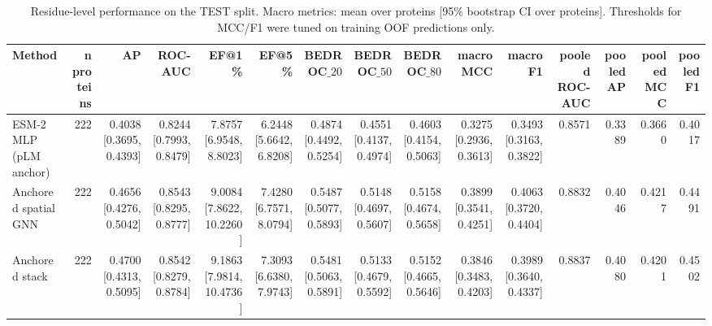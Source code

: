 \begin{table}[t]
\centering
\small
\caption{Residue-level performance on the TEST split. Macro metrics: mean over proteins [95\% bootstrap CI over proteins]. Thresholds for MCC/F1 were tuned on training OOF predictions only.}
\label{tab:table1_performance_test}
\begin{tabular}{lrrrrrrrrrrrrrr}
\toprule
Method & n proteins & AP & ROC-AUC & EF@1\% & EF@5\% & BEDROC$\_{20}$ & BEDROC$\_{50}$ & BEDROC$\_{80}$ & macro MCC & macro F1 & pooled ROC-AUC & pooled AP & pooled MCC & pooled F1 \\
\midrule
ESM-2 MLP (pLM anchor) & 222 & 0.4038 [0.3695, 0.4393] & 0.8244 [0.7993, 0.8479] & 7.8757 [6.9548, 8.8023] & 6.2448 [5.6642, 6.8208] & 0.4874 [0.4492, 0.5254] & 0.4551 [0.4137, 0.4974] & 0.4603 [0.4154, 0.5063] & 0.3275 [0.2936, 0.3613] & 0.3493 [0.3163, 0.3822] & 0.8571 & 0.3389 & 0.3660 & 0.4017 \\
Anchored spatial GNN & 222 & 0.4656 [0.4276, 0.5042] & 0.8543 [0.8295, 0.8777] & 9.0084 [7.8622, 10.2260] & 7.4280 [6.7571, 8.0794] & 0.5487 [0.5077, 0.5893] & 0.5148 [0.4697, 0.5607] & 0.5158 [0.4674, 0.5658] & 0.3899 [0.3541, 0.4251] & 0.4063 [0.3720, 0.4404] & 0.8832 & 0.4046 & 0.4217 & 0.4491 \\
Anchored stack & 222 & 0.4700 [0.4313, 0.5095] & 0.8542 [0.8279, 0.8784] & 9.1863 [7.9814, 10.4736] & 7.3093 [6.6380, 7.9743] & 0.5481 [0.5063, 0.5891] & 0.5133 [0.4679, 0.5592] & 0.5152 [0.4665, 0.5646] & 0.3846 [0.3483, 0.4203] & 0.3989 [0.3640, 0.4337] & 0.8837 & 0.4080 & 0.4201 & 0.4502 \\
\bottomrule
\end{tabular}
\end{table}
